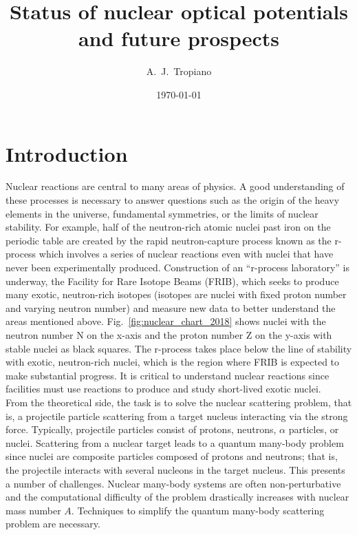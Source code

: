 \documentclass[preprintnumbers,floatfix,aps,prc,preprint,nofootinbib]{revtex4-1}
\begin{document}
\title{Status of nuclear optical potentials and future prospects}


\author{A.~J.~Tropiano}


\date{\today}

\maketitle

\newpage


\section{Introduction}
\label{sec:intro}


Nuclear reactions are central to many areas of physics. A good understanding of these processes is necessary to answer questions such as the origin of the heavy elements in the universe, fundamental symmetries, or the limits of nuclear stability. For example, half of the neutron-rich atomic nuclei past iron on the periodic table are created by the rapid neutron-capture process known as the r-process which involves a series of nuclear reactions even with nuclei that have never been experimentally produced. Construction of an ``r-process laboratory'' is underway, the Facility for Rare Isotope Beams (FRIB), which seeks to produce many exotic, neutron-rich isotopes (isotopes are nuclei with fixed proton number and varying neutron number) and measure new data to better understand the areas mentioned above. Fig.~\ref{fig:nuclear_chart_2018} shows nuclei with the neutron number N on the x-axis and the proton number Z on the y-axis with stable nuclei as black squares. The r-process takes place below the line of stability with exotic, neutron-rich nuclei, which is the region where FRIB is expected to make substantial progress. It is critical to understand nuclear reactions since facilities must use reactions to produce and study short-lived exotic nuclei.
\\

From the theoretical side, the task is to solve the nuclear scattering problem, that is, a projectile particle scattering from a target nucleus interacting via the strong force. Typically, projectile particles consist of protons, neutrons, $\alpha$ particles, or nuclei. Scattering from a nuclear target leads to a quantum many-body problem since nuclei are composite particles composed of protons and neutrons; that is, the projectile interacts with several nucleons in the target nucleus. This presents a number of challenges. Nuclear many-body systems are often non-perturbative and the computational difficulty of the problem drastically increases with nuclear mass number $A$. Techniques to simplify the quantum many-body scattering problem are necessary.
\\
\end{document}
